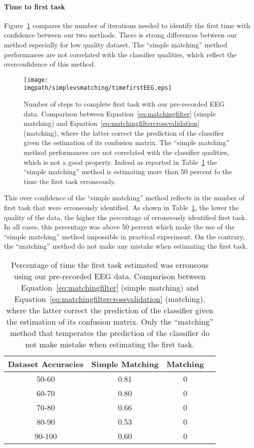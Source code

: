 \paragraph{Time to first task} Figure~\ref{fig:timefirst_simplevsmatchingEEG} compares the number of iterations needed to identify the first time with confidence between our two methods. There is strong differences between our method especially for low quality dataset. The ``simple matching'' method performances are not correlated with the classifier qualities, which reflect the overconfidence of this method.

\begin{figure}[!htbp]
\centering
\texttt{[image: \\imgpath/simplevsmatching/timefirstEEG.eps]}
\caption{Number of steps to complete first task with our pre-recorded EEG data. Comparison between Equation~\ref{eq:matchingfilter} (simple matching) and Equation~\ref{eq:matchingfiltercrossvalidation} (matching), where the latter correct the prediction of the classifier given the estimation of its confusion matrix. The ``simple matching'' method performances are not correlated with the classifier qualities, which is not a good property. Indeed as reported in Table~\ref{tab:errorTaskRatiosimplevsmatchingEEG} the ``simple matching'' method is estimating more than 50 percent fo the time the first task erroneously.}
\label{fig:timefirst_simplevsmatchingEEG}
\end{figure} 

This over confidence of the ``simple matching'' method reflects in the number of first task that were erroneously identified. As shown in Table~\ref{tab:errorTaskRatiosimplevsmatchingEEG}, the lower the quality of the data, the higher the percentage of erroneously identified first task. In all cases, this percentage was above 50 percent which make the use of the ``simple matching'' method impossible in practical experiment. On the contrary, the ``matching'' method do not make any mistake when estimating the first task.

\begin{table}[!htbp]
\centering
{}
\begin{tabular}{c c c c}
    Dataset Accuracies & Simple Matching &  Matching \\ \hline
    50-60 & 0.81 & 0 \\ 
    60-70 & 0.80 & 0 \\
    70-80 & 0.66 & 0 \\
    80-90 & 0.53 & 0 \\
    90-100 & 0.60 & 0 \\
\end{tabular}
\caption{Percentage of time the first task estimated was erroneous using our pre-recorded EEG data. Comparison between Equation~\ref{eq:matchingfilter} (simple matching) and Equation~\ref{eq:matchingfiltercrossvalidation} (matching), where the latter correct the prediction of the classifier given the estimation of its confusion matrix. Only the ``matching'' method that temperates the prediction of the classifier do not make mistake when estimating the first task.}
\label{tab:errorTaskRatiosimplevsmatchingEEG}
\end{table}

